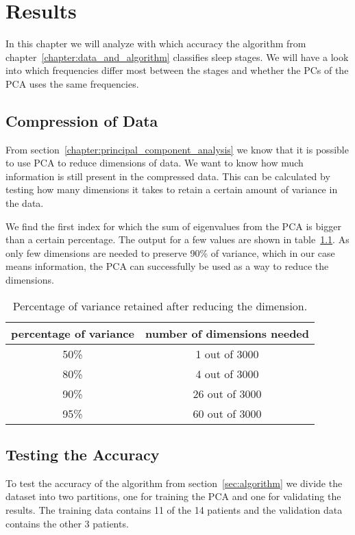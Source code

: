 \chapter{Results}
\label{chapter:results}

In this chapter we will analyze with which accuracy the algorithm from chapter~\ref{chapter:data_and_algorithm} classifies sleep stages. We will have a look into which frequencies differ most between the stages and whether the PCs of the PCA uses the same frequencies.

\section{Compression of Data}
From section~\ref{chapter:principal_component_analysis} we know that it is possible to use PCA to reduce dimensions of data. We want to know how much information is still present in the compressed data. This can be calculated by testing how many dimensions it takes to retain a certain amount of variance in the data.

We find the first index for which the sum of eigenvalues from the PCA is bigger than a certain percentage. The output for a few values are shown in table~\ref{tab:explained_variance}. As only few dimensions are needed to preserve 90\% of variance, which in our case means information, the PCA can successfully be used as a way to reduce the dimensions.

\begin{table}
	\centering
	\begin{tabular}{c|c}
		percentage of variance & number of dimensions needed \\
		\hline
		50\% & 1 out of 3000 \\
		80\% & 4 out of 3000 \\
		90\% & 26 out of 3000 \\
		95\% & 60 out of 3000 \\
	\end{tabular}
	\caption{Percentage of variance retained after reducing the dimension.}
	\label{tab:explained_variance}
\end{table}

\section{Testing the Accuracy}
To test the accuracy of the algorithm from section~\ref{sec:algorithm} we divide the dataset into two partitions, one for training the PCA and one for validating the results. The training data contains 11 of the 14 patients and the validation data contains the other 3 patients.


